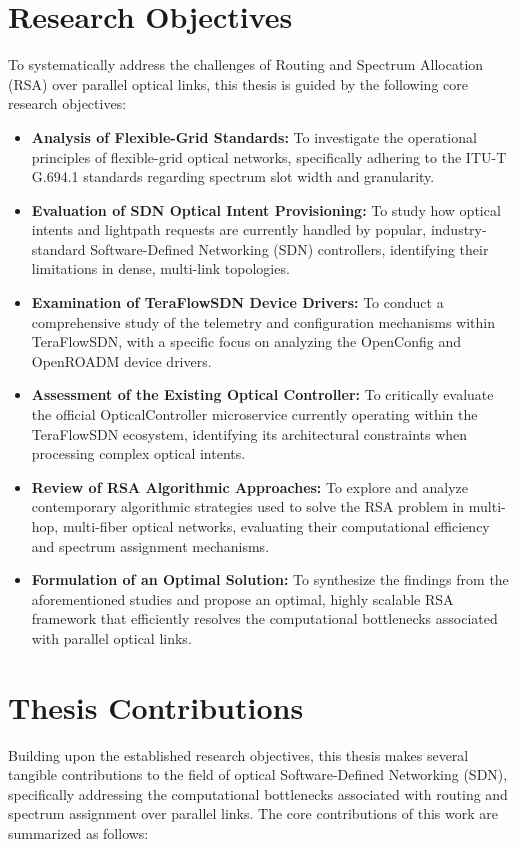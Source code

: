 \section{Research Objectives}
To systematically address the challenges of Routing and Spectrum Allocation (RSA) over parallel optical links, this thesis is guided by the following core research objectives:
\begin{itemize}
    \item \textbf{Analysis of Flexible-Grid Standards:} To investigate the operational principles of flexible-grid optical networks, specifically adhering to the ITU-T G.694.1 standards regarding spectrum slot width and granularity.
    \item \textbf{Evaluation of SDN Optical Intent Provisioning:} To study how optical intents and lightpath requests are currently handled by popular, industry-standard Software-Defined Networking (SDN) controllers, identifying their limitations in dense, multi-link topologies.
    \item \textbf{Examination of TeraFlowSDN Device Drivers:} To conduct a comprehensive study of the telemetry and configuration mechanisms within TeraFlowSDN, with a specific focus on analyzing the OpenConfig and OpenROADM device drivers.
    \item  \textbf{Assessment of the Existing Optical Controller:} To critically evaluate the official OpticalController microservice currently operating within the TeraFlowSDN ecosystem, identifying its architectural constraints when processing complex optical intents.
    \item \textbf{Review of RSA Algorithmic Approaches:} To explore and analyze contemporary algorithmic strategies used to solve the RSA problem in multi-hop, multi-fiber optical networks, evaluating their computational efficiency and spectrum assignment mechanisms.
    \item \textbf{Formulation of an Optimal Solution:} To synthesize the findings from the aforementioned studies and propose an optimal, highly scalable RSA framework that efficiently resolves the computational bottlenecks associated with parallel optical links.
\end{itemize}
\section{Thesis Contributions}
Building upon the established research objectives, this thesis makes several tangible contributions to the field of optical Software-Defined Networking (SDN), specifically addressing the computational bottlenecks associated with routing and spectrum assignment over parallel links. The core contributions of this work are summarized as follows:


